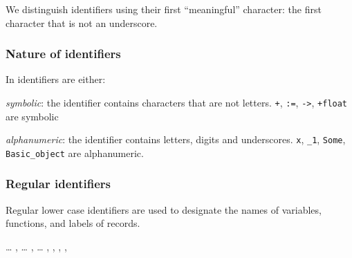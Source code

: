 We distinguish identifiers using their first ``meaningful'' character:
the first character that is not an underscore.

\subsubsection{Nature of identifiers}

In {\focal} identifiers are either:

\begin{citemize}
\item {\em symbolic}: the identifier contains characters that are not
  letters. {\tt +}, {\tt :=}, {\tt ->}, {\tt +float} are symbolic

\item {\em alphanumeric}: the identifier contains letters, digits and
  underscores. {\tt x}, {\tt \_1}, {\tt Some}, {\tt Basic\_object} are
  alphanumeric.
\end{citemize}

\subsubsection{Regular identifiers}

Regular lower case identifiers are used to designate the names of variables, functions,
and labels of records.

\begin{syn}
 \is {} \ldots {}
\sep
{} \is {} \ldots {}
\sep
{} \is {} \ldots {}
\sep
{} \is {} \orelse {}
\sep
{} \is {}
\sep
{} \is {}
\sep
{} \is {} \orelse {}
\end{syn}
\vspace{0.2cm}

